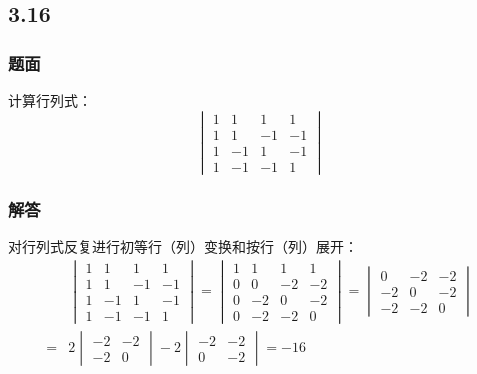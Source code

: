 \documentclass[10pt,xcolor=svgnames]{beamer} %
\begin{document}
\subsection*{3.16}
\begin{frame}
    \frametitle{题面}
    计算行列式：
    \begin{equation*}
        \begin{vmatrix}
            1 & 1  & 1  & 1  \\
            1 & 1  & -1 & -1 \\
            1 & -1 & 1  & -1 \\
            1 & -1 & -1 & 1
        \end{vmatrix}
    \end{equation*}
\end{frame}
\begin{frame}
    \frametitle{解答}
    对行列式反复进行初等行（列）变换和按行（列）展开：
    \begin{align*}
          &
        \begin{vmatrix}
            1 & 1  & 1  & 1  \\
            1 & 1  & -1 & -1 \\
            1 & -1 & 1  & -1 \\
            1 & -1 & -1 & 1
        \end{vmatrix}=
        \begin{vmatrix}
            1 & 1  & 1  & 1  \\
            0 & 0  & -2 & -2 \\
            0 & -2 & 0  & -2 \\
            0 & -2 & -2 & 0
        \end{vmatrix}=
        \begin{vmatrix}
            0  & -2 & -2 \\
            -2 & 0  & -2 \\
            -2 & -2 & 0
        \end{vmatrix} \\
        = & 2
        \begin{vmatrix}
            -2 & -2 \\
            -2 & 0
        \end{vmatrix}-2
        \begin{vmatrix}
            -2 & -2 \\
            0  & -2
        \end{vmatrix}=-16
    \end{align*}
\end{frame}
\end{document}
